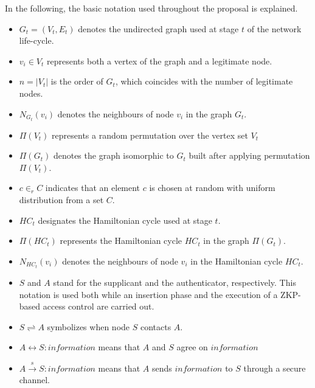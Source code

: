 \documentclass[conference]{IEEEtran}
\begin{document}
In the following, the basic notation used throughout the proposal is explained.

\begin{itemize}
\item $G_t=(V_t,E_t)$ denotes the undirected graph used at stage $t$ of the network
life-cycle.

\item  $v_i \in V_t$ represents both a vertex of the graph and a legitimate node.

\item $n=\left|V_{t}\right|$ is the order of $G_t$, which coincides with the
number of legitimate nodes.

\item $N_{G_{t}}(v_i)$ denotes the neighbours of node $v_i$ in the graph $G_t$.

\item ${\Pi}(V_t)$ represents a random permutation over the
vertex set $V_t$

\item ${\Pi}(G_t)$ denotes the graph isomorphic to $G_t$ built after applying permutation ${\Pi}(V_t)$.

\item $c \in_r C$ indicates that an element $c$ is chosen at random with uniform distribution from a set $C$.

\item $HC_t$ designates the Hamiltonian cycle used at stage $t$.

\item ${\Pi}(HC_t)$ represents the Hamiltonian cycle $HC_t$ in the graph
${\Pi}(G_t)$.

\item $N_{HC_t}(v_i)$ denotes the neighbours of node $v_i$ in the Hamiltonian
cycle $HC_t$.

\item $S$ and $A$ stand for the supplicant and the
authenticator, respectively. This notation is used both while an insertion phase and the
execution of a ZKP-based access control are carried out.

\item $S \rightleftharpoons A$ symbolizes when node $S$ contacts $A$.

\item $A \leftrightarrow S: information $  means that $ A $ and $S$ agree on $information$

\item $A \stackrel{s}{\rightarrow} S: information $  means that $ A $ sends $information$
to $S$ through a secure channel.


\end{itemize}
\end{document}
